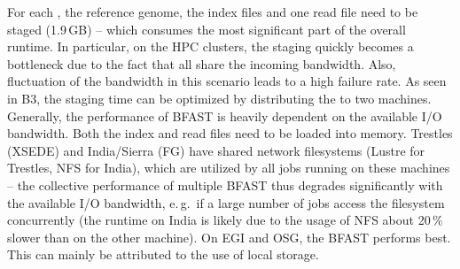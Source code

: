 \documentclass[conference]{IEEEtran}
\begin{document}
For each \cu, the reference genome, the index files and one read file need to
be staged (1.9\,GB) -- which consumes the most significant part of the overall
runtime. In particular, on the HPC clusters, the staging quickly becomes a
bottleneck due to the fact that all \cus share the incoming bandwidth. Also,
fluctuation of the bandwidth in this scenario leads to a high failure rate. As
seen in B3, the staging time can be optimized by distributing the \cus to two
machines. Generally, the performance of BFAST is heavily dependent on the
available I/O bandwidth. Both the index and read files need to be loaded into
memory. Trestles (XSEDE) and India/Sierra (FG) have shared network filesystems
(Lustre for Trestles, NFS for India), which are utilized by all jobs running
on these machines -- the collective performance of multiple BFAST \cu thus
degrades significantly with the available I/O bandwidth, e.\,g.\ if a large
number of jobs access the filesystem concurrently (the runtime on India is
likely due to the usage of NFS about 20\,\% slower than on the other machine).
On EGI and OSG, the BFAST \cu performs best. This can mainly be attributed to
the use of local storage.





\end{document}
